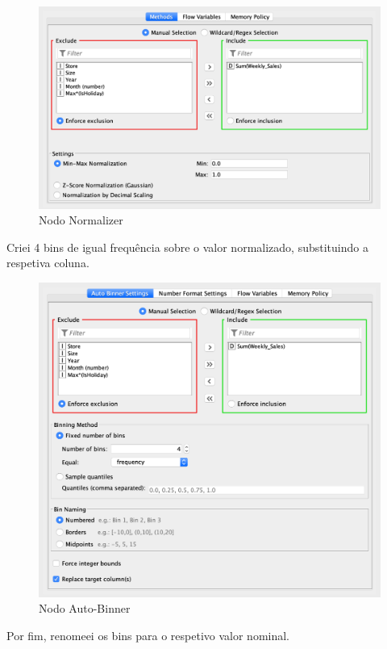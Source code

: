 \begin{figure}[H]
    \centering
    \includegraphics[scale=0.3]{Images/T2_d.png}
    \caption{Nodo Normalizer}
\end{figure}

Criei 4 bins de igual frequência sobre o valor normalizado, substituindo a respetiva coluna.

\begin{figure}[H]
    \centering
    \includegraphics[scale=0.3]{Images/T2_e.png}
    \caption{Nodo Auto-Binner}
\end{figure}

\clearpage

Por fim, renomeei os bins para o respetivo valor nominal.

